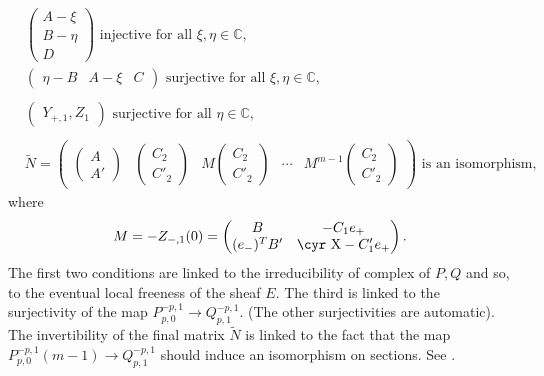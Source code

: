 \documentclass[12pt]{article}
\theoremstyle{definition}
\theoremstyle{remark}
\numberwithin{theorem}{section}
\newcommand{\Sh}{\hbox{\cyr X}}
\def\bC{{\mathbb {C}}}
\newcommand{\D}[2]{\frac{D #1}{d#2}}
\begin{document}
 \begin{align}
&\begin{pmatrix}A-\xi\\B-\eta\\D\end{pmatrix}
             \text{ injective for all }\xi,\eta\in \bC,\label{gencon1}\\
&\begin{pmatrix}\eta-B&A-\xi& C\end{pmatrix}
           \text{ surjective for all }\xi,\eta\in \bC,\label{gencon2}\\
            \nonumber\\
&\begin{pmatrix}Y_{+,1},Z_1\end{pmatrix}
             \text{ surjective for all }\eta \in \bC,\label{gencon3}\\
\nonumber\\
&\widetilde N= \begin{pmatrix}\begin{pmatrix}A\\A'\end{pmatrix}&\begin{pmatrix}C_2\\ C'_2\end{pmatrix}&M\begin{pmatrix}C_2\\ C'_2\end{pmatrix}&\cdots&
           M^{m-1}\begin{pmatrix}C_2\\ C'_2\end{pmatrix}\end{pmatrix} \text{ is an isomorphism},\label{gencon4}
\end{align}
where
\begin{equation}
M= -Z_{-,1}(0)= \begin{pmatrix} B& -C_1e_+   \\
                        (e_-)^TB' &\Sh-C_1'e_+\end{pmatrix}.
\end{equation}
The first two conditions are linked to the irreducibility of complex of $P,Q$ and so, to the eventual local freeness of the sheaf $E$. The third is linked to the surjectivity of the map $P_{p,0}^{-p,1}\rightarrow Q_{p,1}^{-p ,1}.$ (The other surjectivities are automatic). The invertibility of the final matrix $\tilde N$ is linked to the fact that the map $P_{p,0}^{-p,1}(m-1)\rightarrow Q_{p,1}^{-p ,1}$ should induce an isomorphism on sections. See \cite[Lemma 7]{Charbonneau:2006gu}.
\end{document}

